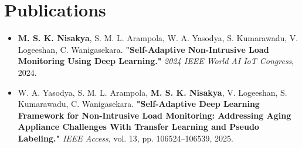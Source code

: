 \section{\Large Publications}
\begin{itemize}[leftmargin=0.15in, label={}]
\small
\item{
\textbf{M. S. K. Nisakya}, S. M. L. Arampola, W. A. Yasodya, S. Kumarawadu, V. Logeeshan, C. Wanigasekara.
\textbf{"Self-Adaptive Non-Intrusive Load Monitoring Using Deep Learning."}
\textit{2024 IEEE World AI IoT Congress}, 2024.
\href{https://ieeexplore.ieee.org/document/10579028}{\color{bleudefrance}{\faExternalLink*}}
}
\vspace{6pt}

\item{
W. A. Yasodya, S. M. L. Arampola, \textbf{M. S. K. Nisakya}, V. Logeeshan, S. Kumarawadu, C. Wanigasekara.
\textbf{"Self-Adaptive Deep Learning Framework for Non-Intrusive Load Monitoring: Addressing Aging Appliance Challenges With Transfer Learning and Pseudo Labeling."}
\textit{IEEE Access}, vol. 13, pp. 106524–106539, 2025.
\href{https://ieeexplore.ieee.org/document/11044358}{\color{bleudefrance}{\faExternalLink*}}
}
\end{itemize}